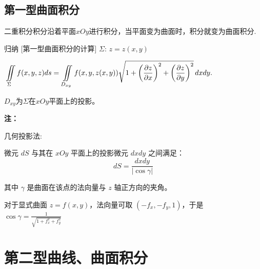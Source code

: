 \documentclass[a4paper,12pt,oneside,fontset=none]{ctexbook}
\let\oldiint\iint
\renewcommand{\iint}{\displaystyle{\vrule width 0pt height 0em depth 0em}\oldiint}
\newenvironment{induction}[1][]{\begin{thmBox}{归纳}{#1}}{\end{thmBox}}
\newenvironment{note}{
    \par\vspace{0.5em}\noindent
    \textbf{\color{NoteColor} 注：}
}{
    \par\vspace{0.5em}
}
\numberwithin{equation}{chapter}
\begin{document}
\subsection{第一型曲面积分}
二重积分积分沿着平面$xOy$进行积分，当平面变为曲面时，积分就变为曲面积分.
\begin{induction}
    [第一型曲面积分的计算]
    $\Sigma:\, z=z(x,y)$

    $\iint\limits_{\Sigma} f(x,y,z)ds = \iint\limits_{D_{xy}} f(x,y,z(x,y)) \sqrt{1 + \left(\frac{\partial z}{\partial x}\right)^2 + \left(\frac{\partial z}{\partial y}\right)^2} \, dx dy.$  
    
    $D_{xy}$为$\Sigma$在$xOy$平面上的投影。

    \color{blue}{$z = f(x,y)$必须是单值函数才能进行投影，否则需要使用对称性、拆分区域处理。}
\end{induction}
\begin{note}
几何投影法:

微元 $dS$ 与其在 $xOy$ 平面上的投影微元 $dxdy$ 之间满足：
$$dS = \frac{dxdy}{|\cos \gamma|}$$

其中 $\gamma$ 是曲面在该点的法向量与 $z$ 轴正方向的夹角。

对于显式曲面 $z=f(x,y)$，法向量可取 $(-f_x, -f_y, 1)$，于是
$\cos\gamma = \frac{1}{\sqrt{1+f_x^2+f_y^2}}$
\end{note}

\section{第二型曲线、曲面积分}
\end{document}
